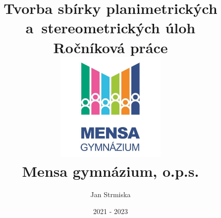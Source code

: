 \title{
        {\Huge Tvorba sbírky planimetrických a~stereometrických úloh}\\
    {\large Ročníková práce}\\
    {\includegraphics[width=0.4\textwidth]{mensa_logo_s_nazvem}}\\
    {\large Mensa gymnázium, o.p.s.}
}
\author{
        {\Large Jan Strmiska}
}
\date{
    2021 - 2023
}

\hypersetup{unicode}
\hypersetup{breaklinks=true}

\newcommand{\rectangle}{\ooalign{$\sqsubset\mkern2mu$\cr$\mkern9mu\sqsupset$\cr}}

\makeatletter
\def\@makechapterhead#1{
        {\parindent \z@ \raggedright \normalfont
    \Huge\bfseries \thechapter. #1
    \par\nobreak
    \vskip 20\p@
    }}
\def\@makeschapterhead#1{
        {\parindent \z@ \raggedright \normalfont
    \Huge\bfseries #1
    \par\nobreak
    \vskip 20\p@
    }}
\makeatother


\renewcommand{\angle}{\measuredangle}